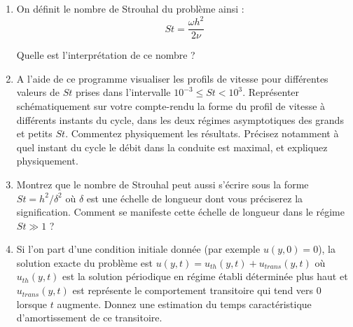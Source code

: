 \documentclass[a4,12pt]{article}
\begin{document}
\begin{enumerate}

\item On définit le nombre de Strouhal du problème ainsi :
$$
St = \frac{\omega h^2}{2 \nu}
$$

Quelle est l'interprétation de ce nombre ? 

\item 
A l'aide de ce programme visualiser les profils de vitesse pour différentes valeurs de $St$ prises dans l'intervalle $10^{-3} \leq St <10^3$.
Repr\'esenter sch\'ematiquement sur votre compte-rendu la forme du profil de vitesse
à différents instants du cycle, dans les deux r\'egimes asymptotiques des grands et petits $St$.
Commentez physiquement les résultats. Précisez notamment à quel instant du cycle le débit dans la conduite est maximal, et expliquez physiquement.









\item  Montrez que le nombre de Strouhal peut aussi s'écrire sous la	 forme $St = h^2/\delta^2$ où $\delta$ est une échelle de longueur
dont vous préciserez la signification. Comment se manifeste cette échelle de longueur dans le régime $St\gg 1$ ?

\item Si l'on part d'une condition initiale donnée (par exemple $u(y,0) =0$), la solution exacte du problème est $u(y,t)= u_{th}(y,t) + u_{trans}(y,t)$
où $u_{th}(y,t) $ est la solution périodique en régime établi déterminée plus haut et $u_{trans}(y,t)$ est représente le comportement transitoire qui tend vers $0$ lorsque $t$ augmente. Donnez une estimation du temps caractéristique d'amortissement de ce transitoire. 



\end{enumerate}
\end{document}
